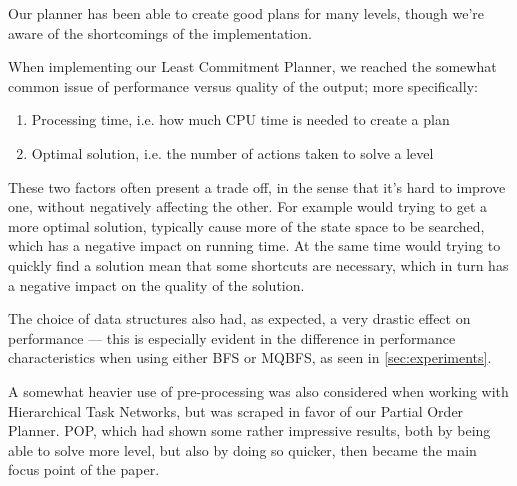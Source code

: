 \documentclass[Main]{subfiles}
\begin{document}
Our planner has been able to create good plans for many levels, though we're aware of the shortcomings of the implementation.




When implementing our Least Commitment Planner, we reached the somewhat common issue of performance versus quality of the output; more specifically:

\begin{enumerate}
	\item Processing time, i.e. how much CPU time is needed to create a plan
	\item Optimal solution, i.e. the number of actions taken to solve a level
\end{enumerate}

These two factors often present a trade off, in the sense that it's hard to improve one, without negatively affecting the other. 
For example would trying to get a more optimal solution, typically cause more of the state space to be searched, which has a negative impact on running time.
At the same time would trying to quickly find a solution mean that some shortcuts are necessary, which in turn has a negative impact on the quality of the solution.

The choice of data structures also had, as expected, a very drastic effect on performance ---
this is especially evident in the difference in performance characteristics when using either BFS or MQBFS, as seen in \autoref{sec:experiments}.

A somewhat heavier use of pre-processing was also considered when working with Hierarchical Task Networks, but was scraped in favor of our Partial Order Planner. 
POP, which had shown some rather impressive results, both by being able to solve more level, but also by doing so quicker, then became the main focus point of the paper.
\end{document}
